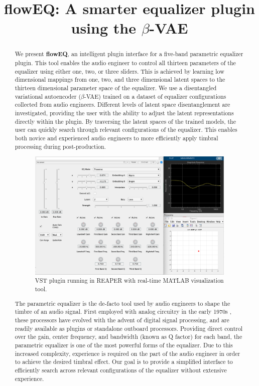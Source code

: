 \documentclass[a4paper]{article} %
\title{\MakeLowercase{flow}EQ: A smarter equalizer plugin using the $\beta$-VAE}
\begin{document}
\maketitle

\begin{abstract}


We present \textbf{flowEQ}, an intelligent plugin interface for a five-band parametric equalizer plugin. 
This tool enables the audio engineer to control all thirteen parameters of the equalizer using either one, two, or three sliders. 
This is achieved by learning low dimensional mappings from one, two, and three dimensional latent spaces to the thirteen dimensional parameter space of the equalizer. 
We use a disentangled variational autoencoder ($\beta$-VAE) trained on a dataset of equalizer configurations collected from audio engineers. 
Different levels of latent space disentanglement are investigated, providing the user with the ability to adjust the latent representations directly within the plugin. 
By traversing the latent spaces of the trained models, the user can quickly search through relevant configurations of the equalizer. 
This enables both novice and experienced audio engineers to more efficiently apply timbral processing during post-production.


\begin{figure}[H]
  \centerline{
  \includegraphics[width=0.5\columnwidth]{../../img/full_visual.png}}
  \caption{VST plugin running in REAPER with real-time MATLAB visualization tool.}
  \label{fig:plugin}
 \end{figure}


The parametric equalizer is the de-facto tool used by audio engineers to shape the timbre of an audio signal. 
First employed with analog circuitry in the early 1970s \cite{massenburg}, these processors have evolved with the advent of digital signal processing, and are readily available as plugins or standalone outboard processors. 
Providing direct control over the gain, center frequency, and bandwidth (known as Q factor) for each band, the parametric equalizer is one of the most powerful forms of the equalizer. 
Due to this increased complexity, experience is required on the part of the audio engineer in order to achieve the desired timbral effect. 
Our goal is to provide a simplified interface to efficiently search across relevant configurations of the equalizer without extensive experience. 


\end{abstract}
\end{document}
